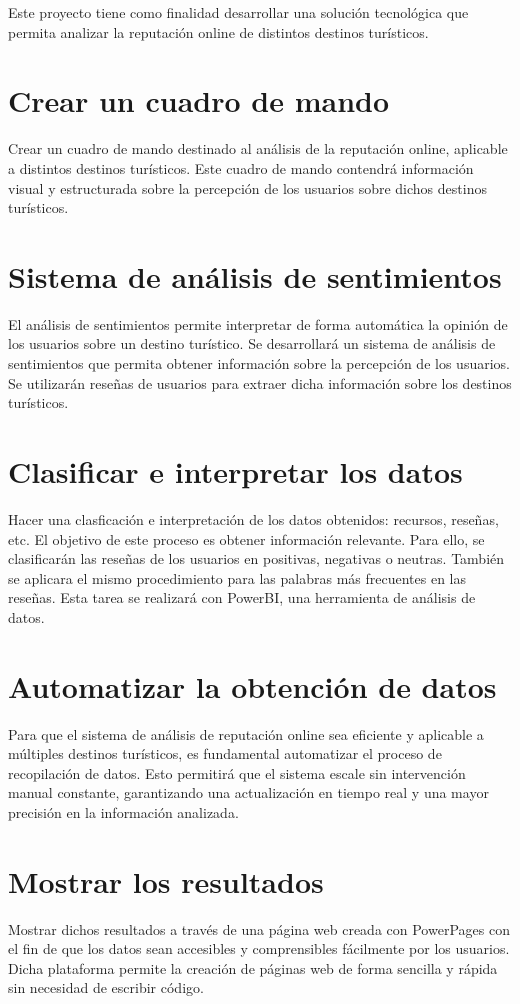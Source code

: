 
Este proyecto tiene como finalidad desarrollar una solución tecnológica que permita analizar la reputación online de distintos destinos turísticos.

\section {Crear un cuadro de mando}
Crear un cuadro de mando destinado al análisis de la reputación online, aplicable a distintos destinos turísticos.
Este cuadro de mando contendrá información visual y estructurada sobre la percepción de los usuarios sobre dichos destinos turísticos.

\section {Sistema de análisis de sentimientos}
El análisis de sentimientos permite interpretar de forma automática la opinión de los usuarios sobre un destino turístico.
Se desarrollará un sistema de análisis de sentimientos que permita obtener información sobre la percepción de los usuarios.
Se utilizarán reseñas de usuarios para extraer dicha información sobre los destinos turísticos.

\section {Clasificar e interpretar los datos}
Hacer una clasficación e interpretación de los datos obtenidos: recursos, reseñas, etc. El objetivo de este proceso es obtener información relevante.
Para ello, se clasificarán las reseñas de los usuarios en positivas, negativas o neutras.
También se aplicara el mismo procedimiento para las palabras más frecuentes en las reseñas.
Esta tarea se realizará con PowerBI, una herramienta de análisis de datos.

\section {Automatizar la obtención de datos}
 
Para que el sistema de análisis de reputación online sea eficiente y aplicable a múltiples destinos turísticos, es fundamental automatizar el proceso de recopilación de datos. 
Esto permitirá que el sistema escale sin intervención manual constante, garantizando una actualización en tiempo real y una mayor precisión en la información analizada.

\section {Mostrar los resultados}
Mostrar dichos resultados a través de una página web creada con PowerPages con el fin de que los datos sean accesibles y comprensibles fácilmente por los usuarios.
Dicha plataforma permite la creación de páginas web de forma sencilla y rápida sin necesidad de escribir código.

